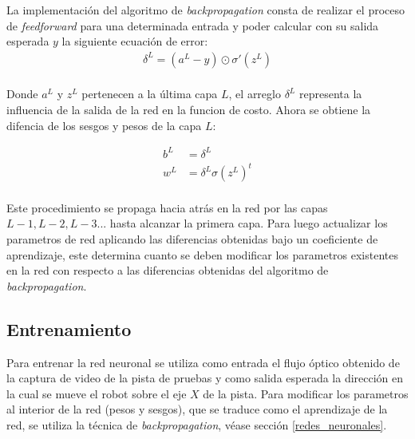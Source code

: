 \documentclass{iccmemoria}
\begin{document}
La implementación del algoritmo de \emph{backpropagation} consta de realizar el proceso de \emph{feedforward} para una determinada entrada y poder calcular con su salida esperada $y$ la siguiente ecuación de error:\\

\begin{equation}
	\begin{split}
	\delta^L = (a^L-y) \odot \sigma'(z^L)
	\end{split}
\end{equation}\\

Donde $a^{L}$ y $z^{L}$ pertenecen a la última capa $L$, el arreglo $\delta^{L}$ representa la influencia de la salida de la red en la funcion de costo. Ahora se obtiene la difencia de los sesgos y pesos de la capa $L$:

\begin{equation}
	\begin{split}
	b^L & = \delta^L\\
	w^L & = \delta^L \sigma(z^L)^t
	\end{split}
\end{equation}\\

Este procedimiento se propaga hacia atrás en la red por las capas $L-1, L-2, L-3...$ hasta alcanzar la primera capa. Para luego actualizar los parametros de red aplicando las diferencias obtenidas bajo un coeficiente de aprendizaje, este determina cuanto se deben modificar los parametros existentes en la red con respecto a las diferencias obtenidas del algoritmo de \emph{backpropagation}.


\subsection{Entrenamiento}

Para entrenar la red neuronal se utiliza como entrada el flujo óptico obtenido de la captura de video de la pista de pruebas y como salida esperada la dirección en la cual se mueve el robot sobre el eje $X$ de la pista. Para modificar los parametros al interior de la red (pesos y sesgos), que se traduce como el aprendizaje de la red, se utiliza la técnica de \emph{backpropagation}, véase sección \ref{redes_neuronales}.\\
\end{document}
